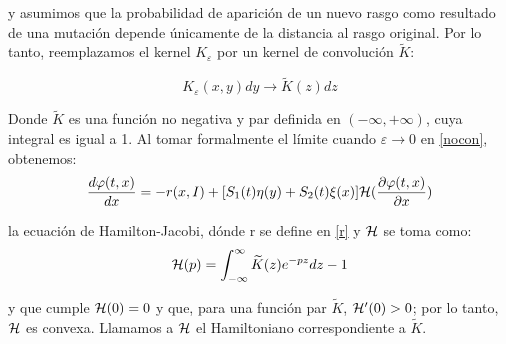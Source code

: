         \normalsize{y asumimos que la probabilidad de aparición de un nuevo rasgo como resultado de una mutación depende únicamente de la distancia al rasgo original. Por lo tanto, reemplazamos el kernel $K_{\varepsilon}$ por un kernel de convolución $\widetilde{K}$:}
        
        \begin{equation*}
            K_{\varepsilon}(x,y)dy\longrightarrow \widetilde{K}(z)dz
        \end{equation*}

        \normalsize{Donde $\widetilde{K}$ es una función no negativa y par definida en $(-\infty,+\infty)$, cuya integral es igual a 1. Al tomar formalmente el límite cuando $\varepsilon\to 0$ en \eqref{nocon}, obtenemos:}\\

        \begin{equation}\label{hj}
            \frac{d\varphi(t,x) }{dx}=-r(x,I)+[S_1(t)\eta(y)+S_2(t)\xi(x)]\mathcal{H}(\frac{\partial \varphi(t,x) }{\partial x})
        \end{equation}
            
        \normalsize{la ecuaci\'on de Hamilton-Jacobi, d\'onde r se define en \eqref{r} y $\mathcal{H}$ se toma como:}
        \begin{equation*}
             \mathcal{H}(p)=\int_{-\infty}^{\infty}\widetilde{K}(z)e^{-pz}dz-1
        \end{equation*}

        \normalsize{y que cumple $\mathcal{H}(0)=0$ y que, para una función par $\widetilde{K}$, $\mathcal{H}'(0)>0$; por lo tanto, $\mathcal{H}$ es convexa. Llamamos a $\mathcal{H}$ el Hamiltoniano correspondiente a $\widetilde{K}$.}